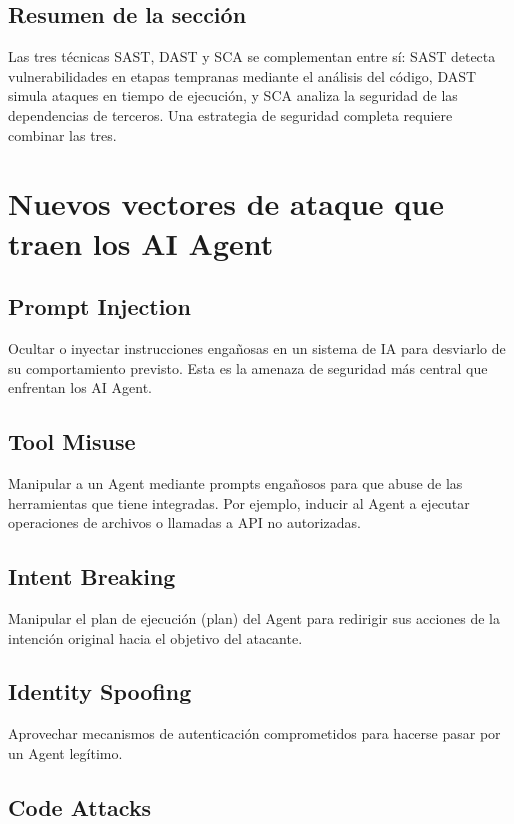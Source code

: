 \documentclass[a4paper]{article}
\begin{document}
\subsection{Resumen de la sección}

Las tres técnicas SAST, DAST y SCA se complementan entre sí: SAST detecta vulnerabilidades en etapas tempranas mediante el análisis del código, DAST simula ataques en tiempo de ejecución, y SCA analiza la seguridad de las dependencias de terceros. Una estrategia de seguridad completa requiere combinar las tres.
\section{Nuevos vectores de ataque que traen los AI Agent}

\subsection{Prompt Injection}

Ocultar o inyectar instrucciones engañosas en un sistema de IA para desviarlo de su comportamiento previsto. Esta es la amenaza de seguridad más central que enfrentan los AI Agent.

\subsection{Tool Misuse}

Manipular a un Agent mediante prompts engañosos para que abuse de las herramientas que tiene integradas. Por ejemplo, inducir al Agent a ejecutar operaciones de archivos o llamadas a API no autorizadas.

\subsection{Intent Breaking}

Manipular el plan de ejecución (plan) del Agent para redirigir sus acciones de la intención original hacia el objetivo del atacante.

\subsection{Identity Spoofing}

Aprovechar mecanismos de autenticación comprometidos para hacerse pasar por un Agent legítimo.

\subsection{Code Attacks}
\end{document}
